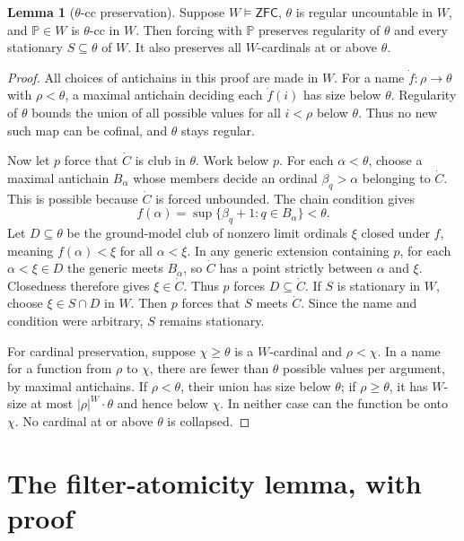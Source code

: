 \documentclass[11pt,letterpaper]{article}
\theoremstyle{definition}
\newtheorem{lemma}[definition]{Lemma}
\numberwithin{equation}{section}
\newcommand{\ZFC}{\mathsf{ZFC}}
\newcommand{\PP}{\mathbb P}
\begin{document}
\begin{lemma}[$\theta$-cc preservation]\label{lem:ccpreserve}
Suppose $W\models\ZFC$, $\theta$ is regular uncountable in $W$, and
$\PP\in W$ is $\theta$-cc in $W$. Then forcing with $\PP$ preserves
regularity of $\theta$ and every stationary $S\subseteq\theta$ of
$W$. It also preserves all $W$-cardinals at or above $\theta$.
\end{lemma}
\begin{proof}
All choices of antichains in this proof are made in $W$.
For a name $\dot f:\rho\to\theta$ with $\rho<\theta$, a maximal
antichain deciding each $\dot f(i)$ has size below $\theta$.
Regularity of $\theta$ bounds the union of all possible values for
all $i<\rho$ below $\theta$. Thus no new such map can be cofinal,
and $\theta$ stays regular.

Now let $p$ force that $\dot C$ is club in $\theta$. Work below $p$.
For each $\alpha<\theta$, choose a maximal antichain $B_\alpha$
whose members decide an ordinal $\beta_q>\alpha$ belonging to
$\dot C$. This is possible because $\dot C$ is forced unbounded.
The chain condition gives
\[
f(\alpha)=\sup\{\beta_q+1:q\in B_\alpha\}<\theta.
\]
Let $D\subseteq\theta$ be the ground-model club of nonzero limit
ordinals $\xi$ closed under $f$, meaning
$f(\alpha)<\xi$ for all $\alpha<\xi$.
In any generic extension containing $p$, for each $\alpha<\xi\in D$
the generic meets $B_\alpha$, so $\dot C$ has a point strictly between
$\alpha$ and $\xi$. Closedness therefore gives $\xi\in\dot C$.
Thus $p$ forces $D\subseteq\dot C$.
If $S$ is stationary in $W$, choose $\xi\in S\cap D$ in $W$.
Then $p$ forces that $S$ meets $\dot C$. Since the name and condition
were arbitrary, $S$ remains stationary.

For cardinal preservation, suppose $\chi\ge\theta$ is a $W$-cardinal
and $\rho<\chi$. In a name for a function from $\rho$ to $\chi$,
there are fewer than $\theta$ possible values per argument, by maximal
antichains. If $\rho<\theta$, their union has size below $\theta$;
if $\rho\ge\theta$, it has $W$-size at most $|\rho|^W\cdot\theta
$ and hence below $\chi$. In neither case can the function be onto
$\chi$. No cardinal at or above $\theta$ is collapsed.
\end{proof}

\section{The filter-atomicity lemma, with proof}\label{app:atomicity}
\end{document}
